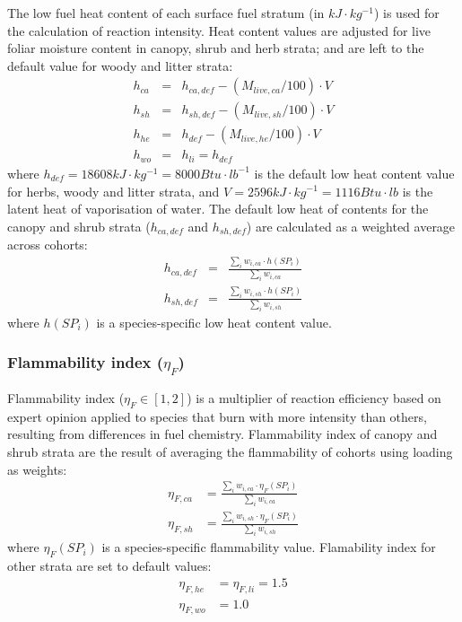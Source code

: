 \documentclass[]{book}
\begin{document}
The low fuel heat content of each surface fuel stratum (in \(kJ\cdot kg^{-1}\)) is used for the calculation of reaction intensity. Heat content values are adjusted for live foliar moisture content in canopy, shrub and herb strata; and are left to the default value for woody and litter strata:
\begin{eqnarray}
h_{ca} &=& h_{ca, def} - (M_{live, ca}/100)\cdot V \\
h_{sh} &=& h_{sh, def} - (M_{live, sh}/100)\cdot V \\
h_{he} &=& h_{def} - (M_{live, he}/100)\cdot V \\
h_{wo} &=& h_{li} = h_{def}
\end{eqnarray}
where \(h_{def} = 18608 kJ\cdot kg^{-1} = 8000 Btu\cdot lb^{-1}\) is the default low heat content value for herbs, woody and litter strata, and \(V = 2596 kJ\cdot kg^{-1} = 1116 Btu\cdot lb\) is the latent heat of vaporisation of water. The default low heat of contents for the canopy and shrub strata (\(h_{ca, def}\) and \(h_{sh, def}\)) are calculated as a weighted average across cohorts:
\begin{eqnarray}
h_{ca, def} &=& \frac{\sum_{i}{w_{i,ca} \cdot h(SP_i)}}{\sum_{i}{w_{i,ca}}}\\
h_{sh, def} &=& \frac{\sum_{i}{w_{i,sh} \cdot h(SP_i)}}{\sum_{i}{w_{i,sh}}}
\end{eqnarray}
where \(h(SP_i)\) is a species-specific low heat content value.

\hypertarget{flammability-index-eta_f}{%
\subsubsection{\texorpdfstring{Flammability index (\(\eta_{F}\))}{Flammability index (\textbackslash{}eta\_\{F\})}}\label{flammability-index-eta_f}}

Flammability index (\(\eta_{F} \in [1, 2]\)) is a multiplier of reaction efficiency based on expert opinion applied to species that burn with more intensity than others, resulting from differences in fuel chemistry. Flammability index of canopy and shrub strata are the result of averaging the flammability of cohorts using loading as weights:
\begin{eqnarray}
\eta_{F, ca} &= \frac{\sum_{i}{w_{i,ca} \cdot \eta_{F}(SP_i)}}{\sum_{i}{w_{i,ca}}}\\
\eta_{F, sh} &= \frac{\sum_{i}{w_{i,sh} \cdot \eta_{F}(SP_i)}}{\sum_{i}{w_{i,sh}}}
\end{eqnarray}
where \(\eta_{F}(SP_i)\) is a species-specific flammability value. Flamability index for other strata are set to default values:
\begin{eqnarray}
\eta_{F, he} &= \eta_{F, li} = 1.5 \\
\eta_{F, wo} &= 1.0
\end{eqnarray}
\end{document}
